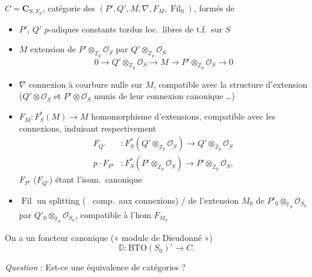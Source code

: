 \documentclass[11pt,a4paper]{article}
\begin{document}
$C = \mathbf{C}_{S, F_S}$, catégorie des 
 $(P', Q', M, \nabla, F_M, \operatorname{Fil}_0)$,
formés de
\begin{itemize}
\item $P'$, $Q'$  $p$-adiques constants tordus \ill{}
loc.\ libres de t.f.\ sur $S$
\item $M$ extension de $P' \otimes_{\mathbb{Z}_p} \mathcal{O}_S$ par
$Q' \otimes_{\mathbb{Z}_p} \mathcal{O}_S$
\[
0 \to Q' \otimes_{\mathbb{Z}_p} \mathcal{O}_S \to M \to
P' \otimes_{\mathbb{Z}_p} \mathcal{O}_S \to 0
\]
\item $\nabla$ connexion à courbure nulle sur $M$, compatible avec
 la structure d'extension ($Q' \otimes \mathcal{O}_S$
et $P' \otimes \mathcal{O}_S$ munis de leur connexion canonique \ldots)
\item $F_M : F_S^{*}(M) \to M$ homomorphisme d'extensions, compatible avec
les connexions, induisant  respectivement
\[
\begin{aligned}
F_{Q'} &: F_S^{*}(Q' \otimes_{\mathbb{Z}_p} \mathcal{O}_S) \to
Q' \otimes_{\mathbb{Z}_p} \mathcal{O}_S \\
p \cdot F_{P'} &: F_S^{*}(P' \otimes_{\mathbb{Z}_p} \mathcal{O}_S) \to
P' \otimes_{\mathbb{Z}_p} \mathcal{O}_S ,
\end{aligned}
\]
$F_{P'}$ ($F_{Q'}$) étant l'isom.\ canonique
\item $\operatorname{Fil}$ un  splitting
(\struck{\ill{}} \ comp.\ aux connexions)
 / de l'extension
$M_0$ de $P'_0 \otimes_{\mathbb{F}_p} \mathcal{O}_{S_0}$ par
$Q'_0 \otimes_{\mathbb{F}_p} \mathcal{O}_{S_0}$, compatible à l'hom
$F_{M_0}$
\end{itemize}

On a un foncteur canonique (« module de Dieudonné »)
\[
\mathbb{D} : \mathrm{BTO}(S_0)^{\circ} \longrightarrow C .
\]

\emph{Question} : Est-ce une équivalence de catégories ?


\end{document}
